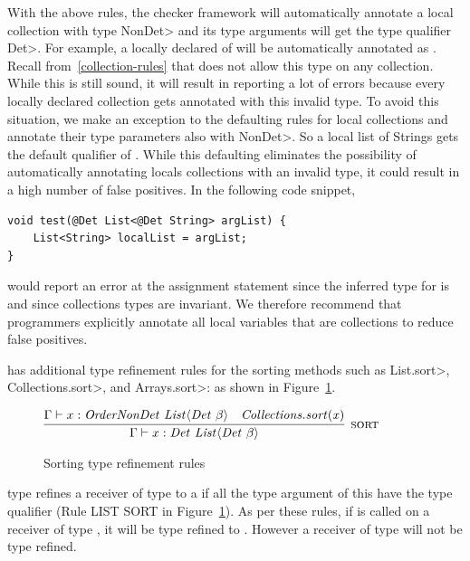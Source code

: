 With the above rules, the checker framework will automatically annotate a local collection with type \<NonDet> and its
type arguments will get the type qualifier \<Det>. For example, a locally declared  of  will be automatically annotated
as . Recall from~\ref{collection-rules} that \theDeterminismChecker does not allow this type on
any collection. While this is still sound, it will result in \theDeterminismChecker reporting a lot of errors because every locally declared 
collection gets annotated with this invalid type. To avoid this situation, we make an exception to the defaulting rules for local collections
and annotate their type parameters also with \<NonDet>. So a local list of Strings gets the default qualifier of . While this defaulting eliminates the possibility of automatically annotating locals collections with an invalid
type, it could result in a high number of false positives. In the following code snippet,
\begin{verbatim}
void test(@Det List<@Det String> argList) {
    List<String> localList = argList;
}    
\end{verbatim}
\theDeterminismChecker would report an error at the assignment statement since the inferred type for  is 
 and since collections types are invariant.
We therefore recommend that programmers explicitly annotate
all local variables that are collections to reduce false positives.

\TheDeterminismChecker has additional type refinement rules for the sorting
methods such as \<List.sort>, \<Collections.sort>, and \<Arrays.sort>:
 as shown in Figure~\ref{fig-sorting}. 
\begin{figure}
%     
    
    $\infer[\textsc{sort}]{\Gamma \vdash x : \|Det \ List|\angles{\|Det| \ \beta}}{\Gamma \vdash x : \|OrderNonDet \ List|\angles{\|Det| \ \beta} & \|Collections.sort(x)|}$
    
%     
    
    \caption{Sorting type refinement rules}
    \label{fig-sorting}
\end{figure}
\TheDeterminismChecker type refines a receiver of type  to a  if all the
type argument of this  have the type qualifier  (Rule LIST SORT in Figure~\ref{fig-sorting}).
As per these rules, if  is called on a receiver of type , it will
be type refined to . However a receiver of type  will not be type refined.

